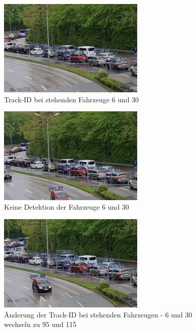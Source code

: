 \documentclass[conference]{IEEEtran}
\begin{document}
		\begin{figure}[!h]
		\begin{center}
			\includegraphics[width=7cm]{Media/track1.jpg}
			\caption{Track-ID bei stehenden Fahrzeuge 6 und 30}
			\label{track1}
		\end{center}
	\end{figure}
	\begin{figure}[!h]
		\begin{center}
			\includegraphics[width=7cm]{Media/track3.jpg}
			\caption{Keine Detektion der Fahrzeuge 6 und 30}
			\label{track1.5}
		\end{center}
	\end{figure}
	\begin{figure}[!h]
		\begin{center}
			\includegraphics[width=7cm]{Media/track2.jpg}
			\caption{Änderung der Track-ID bei stehenden Fahrzeugen - 6 und 30 wechseln zu 95 und 115}
			\label{track2}
		\end{center}
	\end{figure}
	
\end{document}
